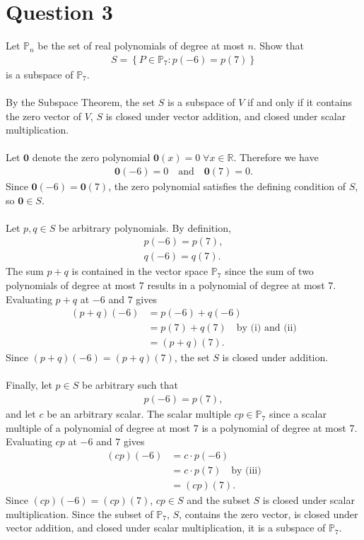 \documentclass[reqno]{amsart}
\renewcommand{\vec}{\mathbf}
\begin{document}
\newpage
\section*{\LARGE{Question 3}}

	Let $\mathbb{P}_n$ be the set of real polynomials of degree at most $n$. Show that
	\begin{align*}
		S = \left\{P \in \mathbb{P}_7: p(-6) = p(7) \right\}
	\end{align*}
	is a subspace of $\mathbb{P}_7$.
	\\ \\
	By the Subspace Theorem, the set $S$ is a subspace of $V$ if and only if it contains the zero vector of $V$, $S$ is closed under vector addition, and closed under scalar multiplication.
	\\ \\	
	Let $\vec{0}$ denote the zero polynomial $\vec{0}(x) = 0 \; \forall x \in \mathbb{R}$. Therefore we have
	\begin{align*}
		\vec{0}(-6) = 0 \quad \text{and} \quad \vec{0}(7) = 0.
	\end{align*}
	Since $\vec{0}(-6) = \vec{0}(7)$, the zero polynomial satisfies the defining condition of $S$, so $\vec{0} \in S$.
	\\ \\
	Let $p,q \in S$ be arbitrary polynomials. By definition,
	\begin{align*}
		\tag{i}
		p(-6) = p(7),	\\
		\tag{ii}
		q(-6) = q(7).
	\end{align*}
	The sum $p + q$ is contained in the vector space $\mathbb{P}_7$ since the sum of two polynomials of degree at most 7 results in a polynomial of degree at most 7. Evaluating $p + q$ at $-6$ and $7$ gives
	\begin{align*}
		(p + q)(-6) &= p(-6) + q(-6)		\\
					&= p(7) + q(7) \quad \text{by (i) and (ii)}			\\
					&= (p + q)(7).
	\end{align*}
	Since $(p + q)(-6) = (p + q)(7)$, the set $S$ is closed under addition.
	\\ \\
	Finally, let $p \in S$ be arbitrary such that
	\begin{align*}
		\tag{iii}
		p(-6) = p(7),
	\end{align*}
	and let $c$ be an arbitrary scalar. The scalar multiple $cp \in \mathbb{P}_7$ since a scalar multiple of a polynomial of degree at most 7 is a polynomial of degree at most 7. Evaluating $cp$ at $-6$ and $7$ gives
	\begin{align*}
		(cp)(-6) &= c \cdot p(-6)	\\
				 &= c \cdot p(7) \quad \text{by (iii)}	\\
				 &= (cp)(7).
	\end{align*}
	Since $(cp)(-6) = (cp)(7)$, $cp \in S$ and the subset $S$ is closed under scalar multiplication. Since the subset of $\mathbb{P}_7$, $S$, contains the zero vector, is closed under vector addition, and closed under scalar multiplication, it is a subspace of $\mathbb{P}_7$.
\end{document}
